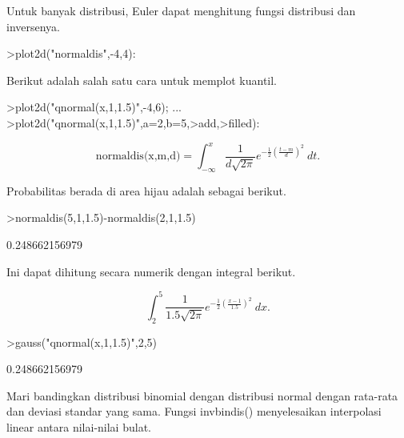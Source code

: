 \documentclass[a4paper,10pt]{article}
\begin{document}
\begin{eulernotebook}
\begin{eulercomment}
Untuk banyak distribusi, Euler dapat menghitung fungsi distribusi dan
inversenya.
\end{eulercomment}
\begin{eulerprompt}
>plot2d("normaldis",-4,4): 
\end{eulerprompt}
\begin{eulercomment}
Berikut adalah salah satu cara untuk memplot kuantil.
\end{eulercomment}
\begin{eulerprompt}
>plot2d("qnormal(x,1,1.5)",-4,6);  ...
>plot2d("qnormal(x,1,1.5)",a=2,b=5,>add,>filled):
\end{eulerprompt}
\begin{eulerformula}
\[
\text{normaldis(x,m,d)}=\int_{-\infty}^x \frac{1}{d\sqrt{2\pi}}e^{-\frac{1}{2}(\frac{t-m}{d})^2}\ dt.
\]
\end{eulerformula}
\begin{eulercomment}
Probabilitas berada di area hijau adalah sebagai berikut.
\end{eulercomment}
\begin{eulerprompt}
>normaldis(5,1,1.5)-normaldis(2,1,1.5)
\end{eulerprompt}
\begin{euleroutput}
  0.248662156979
\end{euleroutput}
\begin{eulercomment}
Ini dapat dihitung secara numerik dengan integral berikut.\\
\end{eulercomment}
\begin{eulerformula}
\[
\int_2^5 \frac{1}{1.5\sqrt{2\pi}}e^{-\frac{1}{2}(\frac{x-1}{1.5})^2}\ dx.
\]
\end{eulerformula}
\begin{eulerprompt}
>gauss("qnormal(x,1,1.5)",2,5)
\end{eulerprompt}
\begin{euleroutput}
  0.248662156979
\end{euleroutput}
\begin{eulercomment}
Mari bandingkan distribusi binomial dengan distribusi normal dengan
rata-rata dan deviasi standar yang sama. Fungsi invbindis()
menyelesaikan interpolasi linear antara nilai-nilai bulat.
\end{eulercomment}
\begin{eulerprompt}

\end{eulerprompt}
\end{eulernotebook}
\end{document}
